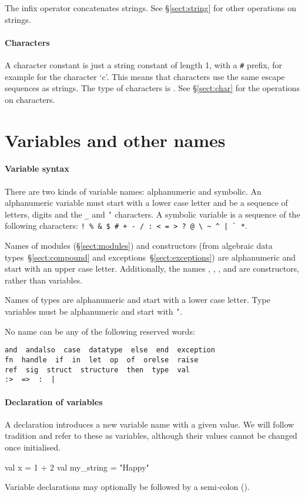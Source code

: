 \documentclass[12pt,a4paper]{book}
\begin{document}
The \smlinline{^} infix operator concatenates strings. See \S\ref{sect:string} for
other operations on strings.

\paragraph{Characters} A character constant is just a string constant of length
1, with a \texttt{\#} prefix, for example  for the character `c'.
This means that characters use the same escape sequences as strings. The type
of characters is . See \S\ref{sect:char} for the operations on characters.

\section{Variables and other names}
\label{sect:variables}

\paragraph{Variable syntax} There are two kinds of variable names: alphanumeric and symbolic. An alphanumeric variable must start
with a lower case letter and be a sequence of letters, digits and the \texttt{\_} and \texttt{'} characters. A symbolic variable is a sequence of the following characters: \verb)! % & $ # + - / : < = > ? @ \ ~ ^ | ` *).

Names of modules (\S\ref{sect:modules}) and constructors (from algebraic data types~\S\ref{sect:compound} and exceptions~\S\ref{sect:exceptions}) are alphanumeric and
start with an upper case letter. Additionally, the names ,
, , and  are
constructors, rather than variables.

Names of types are alphanumeric and start
with a lower case letter.
%
Type variables must be alphanumeric and start with \texttt{'}.

No name can be any of the following reserved words:
\begin{verbatim}
and  andalso  case  datatype  else  end  exception
fn  handle  if  in  let  op  of  orelse  raise
ref  sig  struct  structure  then  type  val
:>  =>  :  |
\end{verbatim} 

\paragraph{Declaration of variables} A  declaration introduces a new variable name with a given value.
We will follow tradition and refer to these as variables, although their values
cannot be changed once initialised.
\begin{smlcode}
val x = 1 + 2
val my_string = "Happy"
\end{smlcode}
Variable declarations may optionally be followed by a semi-colon (\smlinline{;}).
\end{document}
